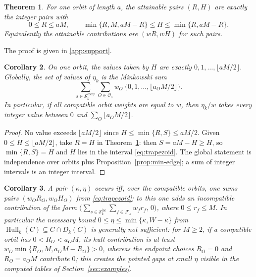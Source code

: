 \documentclass[preprint,12pt,a4paper]{elsarticle}
\newcommand{\Fs}{\mathcal F_s}
\newcommand{\Os}{\mathcal O_s}
\newcommand{\Hull}{\operatorname{Hull}}
\newcommand{\Dk}{D_k}
\newtheorem{theorem}{Theorem}
\newtheorem{corollary}[theorem]{Corollary}
\theoremstyle{definition}
\theoremstyle{remark}
\begin{document}
\begin{theorem}\label{thm:support}
For one orbit of length $a$, the attainable pairs $(R,H)$ are exactly the
integer pairs with
{\footnotesize
\begin{equation}\label{eq:trapezoid}
0\leq R\leq aM,\qquad
\min\{R,M,aM-R\}\leq H\leq\min\{R,aM-R\}.
\end{equation}
}
Equivalently the attainable contributions are $(wR,wH)$ for such pairs.
\end{theorem}

\noindent The proof is given in \ref{app:support}.



\begin{corollary}\label{cor:hull-values}
On one orbit, the values taken by $H$ are exactly
$0,1,\ldots,\lfloor aM/2\rfloor$.  Globally, the set of values of $\eta_k$ is
the Minkowski sum
\[
\sum_{s\in\mathcal{S}_k^{\mathrm{comp}}}\sum_{O\in\Os}
 w_O\,\{0,1,\ldots,\lfloor a_OM/2\rfloor\}.
\]
In particular, if all compatible orbit weights are equal to $w$, then
$\eta_k/w$ takes every integer value between $0$ and
$\sum_O\lfloor a_OM/2\rfloor$.
\end{corollary}

\begin{proof}
No value exceeds $\lfloor aM/2\rfloor$ since
$H\leq\min\{R,S\}\leq aM/2$.  Given $0\leq H\leq\lfloor aM/2\rfloor$, take
$R=H$ in Theorem~\ref{thm:support}: then $S=aM-H\geq H$, so
$\min\{R,S\}=H$ and $H$ lies in the interval \eqref{eq:trapezoid}.  The global
statement is independence over orbits plus Proposition~\ref{prop:min-edge};
a sum of integer intervals is an integer interval.
\end{proof}

\begin{corollary}\label{cor:global-support}
A pair $(\kappa,\eta)$ occurs iff, over the compatible orbits, one sums
pairs $(w_OR_O,w_OH_O)$ from \eqref{eq:trapezoid}; to this one adds an
incompatible contribution of the form
$\bigl(\sum_{s\in\mathcal{S}_k^{\mathrm{inc}}}\sum_{f\in\Fs}w_fr_f,\,0\bigr)$,
where $0\leq r_f\leq M$.  In particular the
necessary bound $0\leq\eta\leq\min\{\kappa,W-\kappa\}$ from
$\Hull_k(C)\subseteq C\cap\Dk(C)$ is generally not sufficient: for $M\geq2$,
if a compatible orbit has $0<R_O<a_OM$, its hull contribution is at least
$w_O\min\{R_O,M,a_OM-R_O\}>0$, whereas the endpoint choices $R_O=0$ and
$R_O=a_OM$ contribute $0$; this creates the
pointed gaps at small $\eta$ visible in the computed tables of
Section~\ref{sec:examples}.
\end{corollary}
\end{document}
